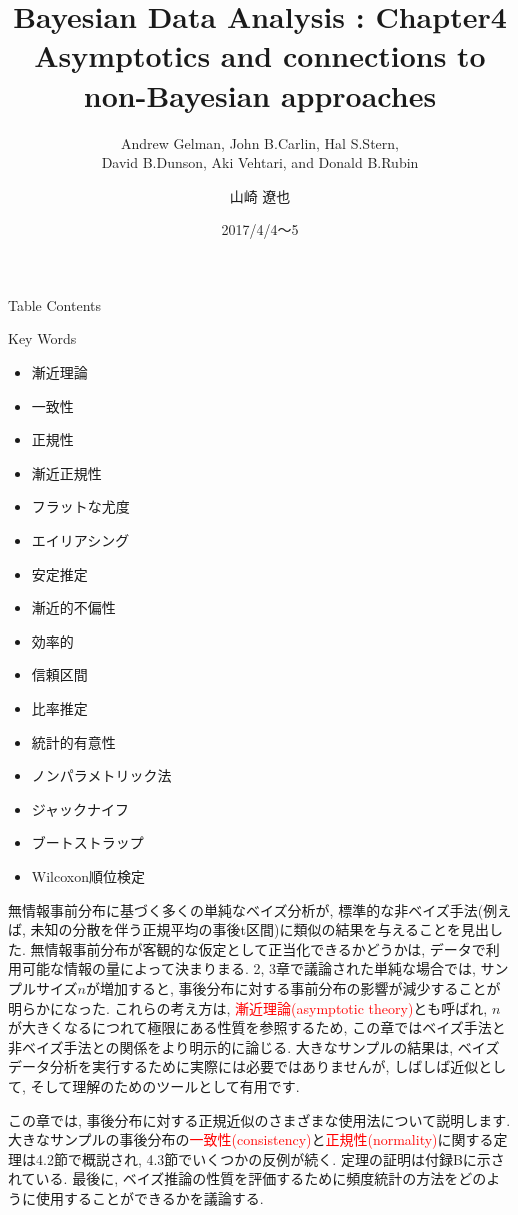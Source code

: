 \documentclass[10pt,dvipdfmx,a4]{beamer}
\title{Bayesian Data Analysis : Chapter4 \\Asymptotics and connections to non-Bayesian approaches}
\subtitle{Andrew Gelman, John B.Carlin, Hal S.Stern,\\David B.Dunson, Aki Vehtari, and Donald B.Rubin}
\author{山崎 遼也}
\institute{情報学科 数理工学コース 4回}
\date{2017/4/4～5}
\newcommand{\tcr}[1]{\textcolor{red}{#1}}
\begin{document}
\frame{\titlepage}

\begin{frame}{Table Contents}
\begin{multicols}{2}
{\scriptsize \tableofcontents}
\end{multicols}
\end{frame}

\begin{frame}{Key Words}
\begin{multicols}{2}
{\scriptsize \begin{itemize}
\item 漸近理論
\item 一致性
\item 正規性
\item 漸近正規性
\item フラットな尤度
\item エイリアシング
\item 安定推定
\item 漸近的不偏性
\item 効率的
\item 信頼区間
\item 比率推定
\item 統計的有意性
\item ノンパラメトリック法
\item ジャックナイフ
\item ブートストラップ
\item Wilcoxon順位検定
\end{itemize}}
\end{multicols}
\end{frame}


\begin{frame}
無情報事前分布に基づく多くの単純なベイズ分析が, 標準的な非ベイズ手法(例えば, 未知の分散を伴う正規平均の事後t区間)に類似の結果を与えることを見出した.
無情報事前分布が客観的な仮定として正当化できるかどうかは, データで利用可能な情報の量によって決まりまる.
2, 3章で議論された単純な場合では, サンプルサイズ$n$が増加すると, 事後分布に対する事前分布の影響が減少することが明らかになった.
これらの考え方は, \tcr{漸近理論(asymptotic theory)}とも呼ばれ, $n$が大きくなるにつれて極限にある性質を参照するため, この章ではベイズ手法と非ベイズ手法との関係をより明示的に論じる.
大きなサンプルの結果は, ベイズデータ分析を実行するために実際には必要ではありませんが, しばしば近似として, そして理解のためのツールとして有用です.

この章では, 事後分布に対する正規近似のさまざまな使用法について説明します.
大きなサンプルの事後分布の\tcr{一致性(consistency)}と\tcr{正規性(normality)}に関する定理は4.2節で概説され, 4.3節でいくつかの反例が続く.
定理の証明は付録Bに示されている.
最後に, ベイズ推論の性質を評価するために頻度統計の方法をどのように使用することができるかを議論する.
\end{frame}
\end{document}
